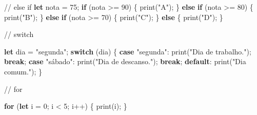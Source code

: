 \documentclass[
  portuguese,
  letterpaper,
  DIV=11,
  numbers=noendperiod]{scrreprt}
\newenvironment{Shaded}{\begin{snugshade}}{\end{snugshade}}
\newcommand{\CommentTok}[1]{\textcolor[rgb]{0.37,0.37,0.37}{#1}}
\newcommand{\ControlFlowTok}[1]{\textcolor[rgb]{0.00,0.23,0.31}{\textbf{#1}}}
\newcommand{\DecValTok}[1]{\textcolor[rgb]{0.68,0.00,0.00}{#1}}
\newcommand{\FunctionTok}[1]{\textcolor[rgb]{0.28,0.35,0.67}{#1}}
\newcommand{\KeywordTok}[1]{\textcolor[rgb]{0.00,0.23,0.31}{\textbf{#1}}}
\newcommand{\NormalTok}[1]{\textcolor[rgb]{0.00,0.23,0.31}{#1}}
\newcommand{\OperatorTok}[1]{\textcolor[rgb]{0.37,0.37,0.37}{#1}}
\newcommand{\StringTok}[1]{\textcolor[rgb]{0.13,0.47,0.30}{#1}}
\begin{document}
\begin{Shaded}
\begin{Highlighting}[]

\CommentTok{// else if}
\KeywordTok{let}\NormalTok{ nota }\OperatorTok{=} \DecValTok{75}\OperatorTok{;}
\ControlFlowTok{if}\NormalTok{ (nota }\OperatorTok{\textgreater{}=} \DecValTok{90}\NormalTok{) \{}
  \FunctionTok{print}\NormalTok{(}\StringTok{"A"}\NormalTok{)}\OperatorTok{;}
\NormalTok{\} }\ControlFlowTok{else} \ControlFlowTok{if}\NormalTok{ (nota }\OperatorTok{\textgreater{}=} \DecValTok{80}\NormalTok{) \{}
  \FunctionTok{print}\NormalTok{(}\StringTok{"B"}\NormalTok{)}\OperatorTok{;}
\NormalTok{\} }\ControlFlowTok{else} \ControlFlowTok{if}\NormalTok{ (nota }\OperatorTok{\textgreater{}=} \DecValTok{70}\NormalTok{) \{}
  \FunctionTok{print}\NormalTok{(}\StringTok{"C"}\NormalTok{)}\OperatorTok{;}
\NormalTok{\} }\ControlFlowTok{else}\NormalTok{ \{}
  \FunctionTok{print}\NormalTok{(}\StringTok{"D"}\NormalTok{)}\OperatorTok{;}
\NormalTok{\}}
\end{Highlighting}
\end{Shaded}

\begin{Shaded}
\begin{Highlighting}[]

\CommentTok{// switch}

\KeywordTok{let}\NormalTok{ dia }\OperatorTok{=} \StringTok{"segunda"}\OperatorTok{;}
\ControlFlowTok{switch}\NormalTok{ (dia) \{}
  \ControlFlowTok{case} \StringTok{"segunda"}\OperatorTok{:}
    \FunctionTok{print}\NormalTok{(}\StringTok{"Dia de trabalho."}\NormalTok{)}\OperatorTok{;}
    \ControlFlowTok{break}\OperatorTok{;}
  \ControlFlowTok{case} \StringTok{"sábado"}\OperatorTok{:}
    \FunctionTok{print}\NormalTok{(}\StringTok{"Dia de descanso."}\NormalTok{)}\OperatorTok{;}
    \ControlFlowTok{break}\OperatorTok{;}
  \ControlFlowTok{default}\OperatorTok{:}
    \FunctionTok{print}\NormalTok{(}\StringTok{"Dia comum."}\NormalTok{)}\OperatorTok{;}
\NormalTok{\}}
\end{Highlighting}
\end{Shaded}

\begin{Shaded}
\begin{Highlighting}[]
\CommentTok{// for}

\ControlFlowTok{for}\NormalTok{ (}\KeywordTok{let}\NormalTok{ i }\OperatorTok{=} \DecValTok{0}\OperatorTok{;}\NormalTok{ i }\OperatorTok{\textless{}} \DecValTok{5}\OperatorTok{;}\NormalTok{ i}\OperatorTok{++}\NormalTok{) \{}
  \FunctionTok{print}\NormalTok{(i)}\OperatorTok{;}
\NormalTok{\}}
\end{Highlighting}
\end{Shaded}
\end{document}
